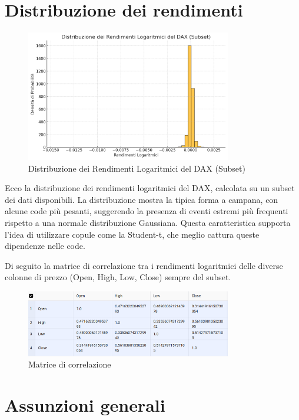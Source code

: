\documentclass[%
	corpo=11pt,
    twoside,
    stile=classica,
    oldstyle,
    tipotesi=custom,
    greek,
    evenboxes,
]{toptesi}
\begin{document}
\newpage

\section{Distribuzione dei rendimenti}

\begin{figure}[h]
	\centering
	\includegraphics[width=0.8\textwidth]{./Pictures/rendimenti.png}
	\caption{Distribuzione dei Rendimenti Logaritmici del DAX (Subset)}
	\label{fig:log_returns_distribution}
\end{figure}

Ecco la distribuzione dei rendimenti logaritmici del DAX, calcolata su un subset dei dati disponibili. La distribuzione mostra la tipica forma a campana, con alcune code più pesanti, suggerendo la presenza di eventi estremi più frequenti rispetto a una normale distribuzione Gaussiana. Questa caratteristica supporta l’idea di utilizzare copule come la Student-t, che meglio cattura queste dipendenze nelle code.


Di seguito la matrice di correlazione tra i rendimenti logaritmici delle diverse colonne di prezzo (Open, High, Low, Close) sempre del subset.

\begin{figure}[h]
	\centering
	\includegraphics[width=0.8\textwidth]{./Pictures/corr.png}
	\caption{Matrice di correlazione}
	\label{fig:correlation_matrix}
\end{figure}

\section{Assunzioni generali}
\end{document}
